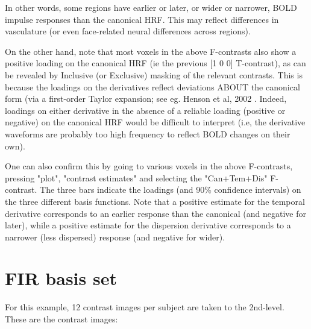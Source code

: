 In other words, some regions have earlier or later, or wider or narrower, BOLD impulse responses than the canonical HRF. This may reflect differences in vasculature (or even face-related neural differences across regions).  

On the other hand, note that most voxels in the above F-contrasts also show a positive loading on the canonical HRF (ie the previous [1 0 0] T-contrast), as can be revealed by Inclusive (or Exclusive) masking of the relevant contrasts. This is because the loadings on the derivatives reflect deviations ABOUT the canonical form (via a first-order Taylor expansion; see eg. Henson et al, 2002 \cite{rnah_latency}. Indeed, loadings on either derivative in the absence of a reliable loading (positive or negative) on the canonical HRF would be difficult to interpret (i.e, the derivative waveforms are probably too high frequency to reflect BOLD changes on their own).   

One can also confirm this by going to various voxels in the above F-contrasts, pressing "plot", "contrast estimates" and selecting the "Can+Tem+Dis" F-contrast. The three bars indicate the loadings (and 90\% confidence intervals) on the three different basis functions. Note that a positive estimate for the temporal derivative corresponds to an earlier response than the canonical (and negative for later), while a positive estimate for the dispersion derivative corresponds to a narrower (less dispersed) response (and negative for wider).

\section{FIR basis set}

For this example, 12 contrast images per subject are taken to the 2nd-level. These are the contrast images:

